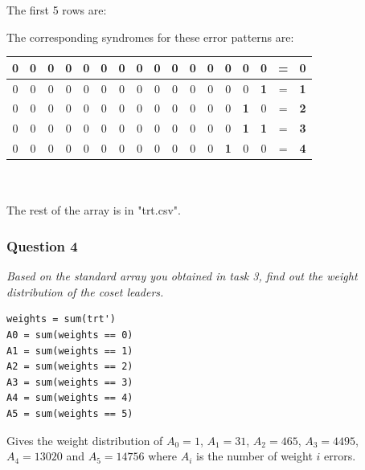 \documentclass[a4paper]{article}
\begin{document}
The first 5 rows are:\\

The corresponding syndromes for these error patterns are:\\
\begin{tabular}{| *{15}{c} | c c |}
\hline
0 & 0 & 0 & 0 & 0 & 0 & 0 & 0 & 0 & 0 & 0 & 0 & 0 & 0 & 0 & = & \textbf{0}  \\
\hline
0 & 0 & 0 & 0 & 0 & 0 & 0 & 0 & 0 & 0 & 0 & 0 & 0 & 0 & \textbf{1} & = & \textbf{1}  \\
\hline
0 & 0 & 0 & 0 & 0 & 0 & 0 & 0 & 0 & 0 & 0 & 0 & 0 & \textbf{1} & 0 & = & \textbf{2}  \\
\hline
0 & 0 & 0 & 0 & 0 & 0 & 0 & 0 & 0 & 0 & 0 & 0 & 0 & \textbf{1} & \textbf{1} & = & \textbf{3}  \\
\hline
0 & 0 & 0 & 0 & 0 & 0 & 0 & 0 & 0 & 0 & 0 & 0 & \textbf{1} & 0 & 0 & = & \textbf{4}  \\
\hline
\end{tabular}\\
\\
The rest of the array is in "trt.csv".

\subsubsection{Question 4} \textit{Based on the standard array you obtained in task 3, find out the weight distribution of the coset leaders.}
\begin{lstlisting}
weights = sum(trt')
A0 = sum(weights == 0)
A1 = sum(weights == 1)
A2 = sum(weights == 2)
A3 = sum(weights == 3)
A4 = sum(weights == 4)
A5 = sum(weights == 5)
\end{lstlisting}
Gives the weight distribution of $A_0 = 1$, $A_1 = 31$, $A_2 = 465$, $A_3 = 4495$, $A_4 = 13020$ and $A_5 = 14756$ where $A_i$ is the number of weight $i$ errors.
\end{document}
